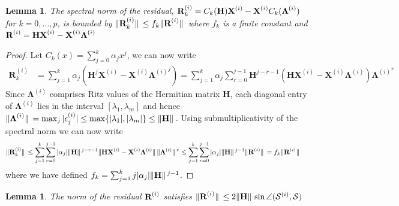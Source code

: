 \documentclass[preprint,3p,number,sort&compress]{elsarticle}
\newtheorem{lemma}[theorem]{Lemma}
\newcommand{\bH}{\textbf{H}}
\newcommand{\bX}{\textbf{X}}
\newcommand{\bR}{\textbf{R}}
\newcommand{\bLam}{\boldsymbol{\Lambda}}
\DeclarePairedDelimiter\norm{\lVert}{\rVert\,}%
\begin{document}
 \begin{lemma}
 The spectral norm of the residual, $\normalfont\bR_k^{(i)}=C_k(\bH)\bX^{(i)}-\bX^{(i)} C_k(\bLam^{(i)})$ for $k=0,\dots,p$, is bounded by $\normalfont\norm{\bR_k^{(i)}}\leq f_k\norm{\bR^{(i)}}$ where $f_k$ is a finite constant and $\normalfont\bR^{(i)}=\bH\bX^{(i)}-\bX^{(i)}\bLam^{(i)}$\label{lem:rkbound}
\end{lemma}
\begin{proof}
 Let $C_k(x)=\sum_{j=0}^k\alpha_jx^j$, we can now write
 \begin{align*}
  \bR_k^{(i)}&=\sum_{j=1}^k\alpha_j\left(\bH^j{\bX^{(i)}}-{\bX^{(i)}}{\bLam^{(i)}}^j\right)=\sum_{j=1}^k\alpha_j\sum_{r=0}^{j-1}\bH^{j-r-1}\left(\bH{\bX^{(i)}}-{\bX^{(i)}}{\bLam^{(i)}}\right){\bLam^{(i)}}^r
 \end{align*}
 Since $\bLam^{(i)}$ comprises Ritz values of the Hermitian matrix $\bH$, each diagonal entry of $\bLam^{(i)}$ lies in the interval $[\lambda_1,\lambda_m]$ and hence $\norm{\bLam^{(i)}}=\max_j|\epsilon_j^{(i)}|\leq \max\{|\lambda_1|,|\lambda_m|\}\leq\norm{\bH}$.
 Using submultiplicativity of the spectral norm we can now write
 \begin{align*}
  \norm{\bR_k^{(i)}}&\leq\sum_{j=1}^k\sum_{r=0}^{j-1}|\alpha_j|\norm{\bH}^{j-r-1}\norm{\bH{\bX^{(i)}}-{\bX^{(i)}}{\bLam^{(i)}}}\norm{\bLam^{(i)}}^r\leq\sum_{j=1}^k\sum_{r=0}^{j-1}|\alpha_j|\norm{\bH}^{j-1}\norm{\bR^{(i)}}=f_k\norm{\bR^{(i)}}
 \end{align*}
 where we have defined $f_k=\sum_{j=1}^k j|\alpha_j|\norm{\bH}^{j-1}$.
\end{proof}
\begin{lemma}
 The norm of the residual 
 $\normalfont\bR^{(i)}$ satisfies $  \normalfont\norm{\bR^{(i)}}\leq 2\norm{\bH}\sin{\angle(\mathcal{S}^{(i)},\mathcal{S})}$\label{lem:TwoNormBound}
\end{lemma}
\end{document}

